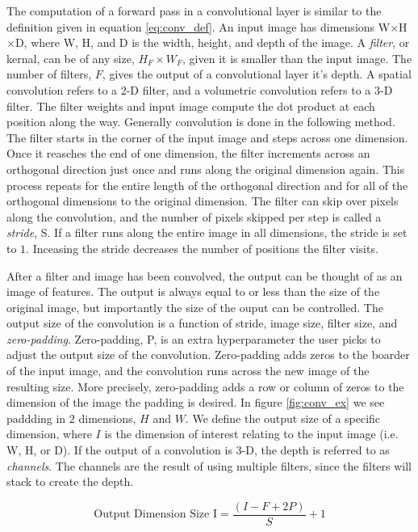 \message{ !name(main.tex)}\documentclass[11pt]{article}
\begin{document}
The computation of a forward pass in a convolutional layer is similar to the definition given in equation \ref{eq:conv_def}. An input image has dimensions W$\times$H$\times$D, where W, H, and D is the width, height, and depth of the image. A \emph{filter}, or kernal, can be of any size, $H_{F} \times W_{F}$, given it is smaller than the input image. The number of filters, $F$, gives the output of a convolutional layer it's depth. A spatial convolution refers to a 2-D filter, and a volumetric convolution refers to a 3-D filter. The filter weights and input image compute the dot product at each position along the way. Generally convolution is done in the following method. The filter starts in the corner of the input image and steps across one dimension. Once it reasches the end of one dimension, the filter increments across an orthogonal direction just once and runs along the original dimension again. This process repeats for the entire length of the orthogonal direction and for all of the orthogonal dimensions to the original dimension. The filter can skip over pixels along the convolution, and the number of pixels skipped per step is called a \emph{stride}, S. If a filter runs along the entire image in all dimensions, the stride is set to $1$. Inceasing the stride decreases the number of positions the filter visits.

After a filter and image has been convolved, the output can be thought of as an image of features. The output is always equal to or less than the size of the original image, but importantly the size of the ouput can be controlled. The output size of the convolution is a function of stride, image size, filter size, and \emph{zero-padding}. Zero-padding, P, is an extra hyperparameter the user picks to adjust the output size of the convolution. Zero-padding adds zeros to the boarder of the input image, and the convolution runs across the new image of the resulting size. More precisely, zero-padding adds a row or column of zeros to the dimension of the image the padding is desired. In figure \ref{fig:conv_ex} we see paddding in $2$ dimensions, $H$ and $W$. We define the output size of a specific dimension, where $I$ is the dimension of interest relating to the input image (i.e. W, H, or D). If the output of a convolution is 3-D, the depth is referred to as \emph{channels}. The channels are the result of using multiple filters, since the filters will stack to create the depth.

\begin{equation}
  \text{Output Dimension Size I} = \frac{(I - F + 2P)}{S} + 1
\end{equation}
\end{document}
